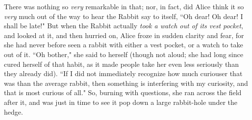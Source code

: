 There was nothing so \emph{very} remarkable in that; nor, in fact, did Alice think it so \emph{very} much out of the way to hear the Rabbit say to itself, ``Oh dear! Oh dear! I shall be late!" But when the Rabbit actually \emph{took a watch out of its vest pocket}, and looked at it, and then hurried on, Alice froze in sudden clarity and fear, for she had never before seen a rabbit with either a vest pocket, or a watch to take out of it. ``Oh bother," she said to herself (though not aloud; she had long since cured herself of that habit, as it made people take her even less seriously than they already did). ``If I did not immediately recognize how much curiouser that was than the average rabbit, then something is interfering with my curiosity, and that is most curious of all." So, burning with questions, she ran across the field after it, and was just in time to see it pop down a large rabbit-hole under the hedge.


